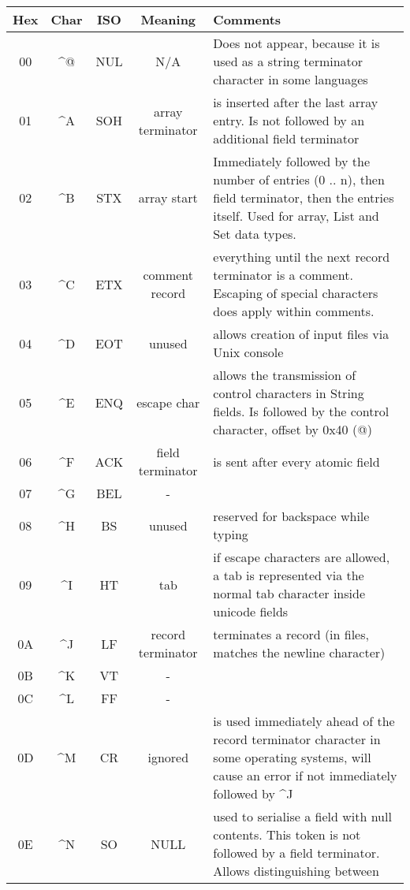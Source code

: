 \documentclass[11pt,a4paper,oneside]{article}
\begin{document}
\begin{tabular}{|c|c|c|c|p{8cm}|}
\hline
Hex & Char & ISO & Meaning & Comments \\
\hline
00 & \textasciicircum {@} & NUL & N/A & Does not appear, because it is used as a
string terminator character in some languages \\
01 & \textasciicircum A & SOH & array terminator  & is inserted after the last array
entry. Is not followed by an additional field terminator \\
02 & \textasciicircum B & STX & array start       & Immediately followed by the number
of entries (0 .. n), then field terminator, then the entries itself. Used for array, List and Set data types. \\
03 & \textasciicircum C & ETX & comment record    & everything until the next
record terminator is a comment. Escaping of special characters does apply within
comments.
\\
04 & \textasciicircum D & EOT & unused            & allows creation of input files
via Unix console \\
05 & \textasciicircum E & ENQ & escape char       & allows the transmission of control
characters in String fields. Is followed by the control character, offset by 0x40 ({@}) \\
06 & \textasciicircum F & ACK & field terminator  & is sent after every atomic field
\\
07 & \textasciicircum G & BEL &       -            & \\
08 & \textasciicircum H & BS & unused             & reserved for backspace while
typing \\
09 & \textasciicircum I & HT &      tab          & if escape characters are
allowed, a tab is represented via the normal tab character inside unicode
fields \\
0A & \textasciicircum J & LF & record terminator & terminates a record (in files,
matches the newline character) \\
0B & \textasciicircum K & VT &       -            & \\
0C & \textasciicircum L & FF &       -            & \\
0D & \textasciicircum M & CR & ignored           & is used immediately ahead of the record
terminator character in some operating systems, will cause an error if not
immediately followed by \textasciicircum J \\
0E & \textasciicircum N & SO & NULL & used to serialise a field with null contents.
This token is not followed by a field terminator. Allows distinguishing between

\end{tabular}
\end{document}
